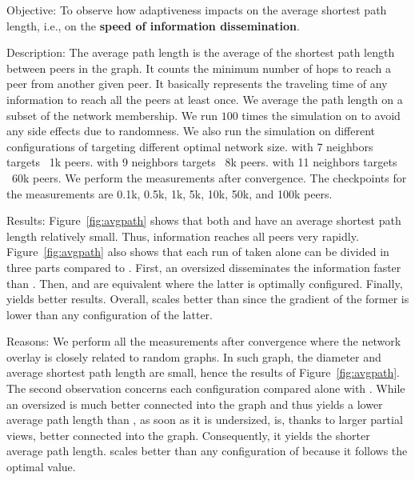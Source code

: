 \begin{asparadesc}
\item[Objective:] To observe how adaptiveness impacts on the average shortest
  path length, i.e., on the \textbf{speed of information dissemination}.
\item[Description:] The average path length is the average of the shortest path
  length between peers in the graph. It counts the minimum number of hops to
  reach a peer from another given peer. It basically represents the traveling
  time of any information to reach all the peers at least once. We average the
  path length on a subset of the network membership. We run $100$ times the
  simulation on \SPRAY to avoid any side effects due to randomness. We also run
  the simulation on different configurations of \CYCLON targeting different
  optimal network size. \CYCLON with 7 neighbors targets ~1k peers. \CYCLON with
  9 neighbors targets ~8k peers. \CYCLON with 11 neighbors targets ~60k
  peers. We perform the measurements after convergence. The checkpoints for the
  measurements are 0.1k, 0.5k, 1k, 5k, 10k, 50k, and 100k peers.
\item[Results:] Figure~\ref{fig:avgpath} shows that both \CYCLON and \SPRAY have
  an average shortest path length relatively small. Thus, information reaches
  all peers very rapidly. Figure~\ref{fig:avgpath} also shows that each run of
  \CYCLON taken alone can be divided in three parts compared to \SPRAY. First,
  an oversized \CYCLON disseminates the information faster than \SPRAY. Then,
  \SPRAY and \CYCLON are equivalent where the latter is optimally
  configured. Finally, \SPRAY yields better results. Overall, \SPRAY scales
  better than \CYCLON since the gradient of the former is lower than any
  configuration of the latter.
\item[Reasons:] We perform all the measurements after convergence where the
  network overlay is closely related to random graphs. In such graph, the
  diameter and average shortest path length are small, hence the results of
  Figure~\ref{fig:avgpath}. The second observation concerns each \CYCLON
  configuration compared alone with \SPRAY. While an oversized \CYCLON is much
  better connected into the graph and thus yields a lower average path length
  than \SPRAY, as soon as it is undersized, \SPRAY is, thanks to larger partial
  views, better connected into the graph.  Consequently, it yields the shorter
  average path length. \SPRAY scales better than any configuration of \CYCLON
  because it follows the optimal value.
\end{asparadesc}

